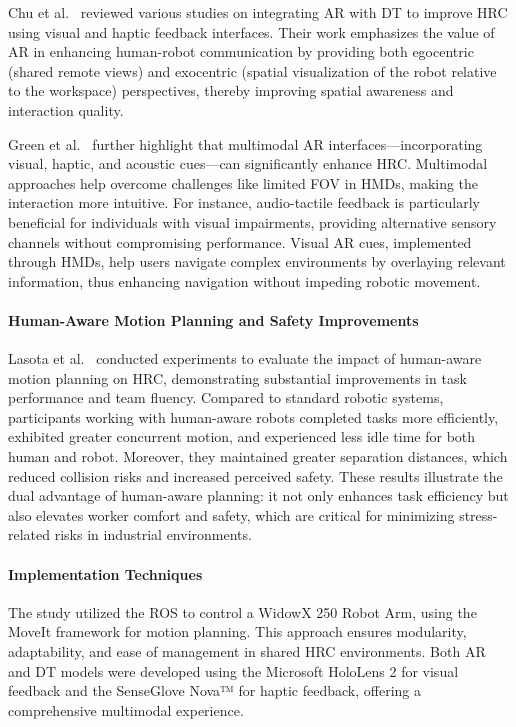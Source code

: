Chu et al.~\cite{CHU2023313} reviewed various studies on integrating \ac{AR} with \ac{DT} to improve \ac{HRC} using visual and haptic feedback interfaces. Their work emphasizes the value of \ac{AR} in enhancing human-robot communication by providing both egocentric (shared remote views) and exocentric (spatial visualization of the robot relative to the workspace) perspectives, thereby improving spatial awareness and interaction quality. 

Green et al.~\cite{doi:10.5772/5664} further highlight that multimodal \ac{AR} interfaces—incorporating visual, haptic, and acoustic cues—can significantly enhance \ac{HRC}. Multimodal approaches help overcome challenges like limited \ac{FOV} in \ac{HMDs}, making the interaction more intuitive. For instance, audio-tactile feedback is particularly beneficial for individuals with visual impairments, providing alternative sensory channels without compromising performance. Visual \ac{AR} cues, implemented through \ac{HMDs}, help users navigate complex environments by overlaying relevant information, thus enhancing navigation without impeding robotic movement.

\paragraph{Human-Aware Motion Planning and Safety Improvements}

Lasota et al.~\cite{doi:10.1177/0018720814565188} conducted experiments to evaluate the impact of human-aware motion planning on \ac{HRC}, demonstrating substantial improvements in task performance and team fluency. Compared to standard robotic systems, participants working with human-aware robots completed tasks more efficiently, exhibited greater concurrent motion, and experienced less idle time for both human and robot. Moreover, they maintained greater separation distances, which reduced collision risks and increased perceived safety. These results illustrate the dual advantage of human-aware planning: it not only enhances task efficiency but also elevates worker comfort and safety, which are critical for minimizing stress-related risks in industrial environments.

\paragraph{Implementation Techniques}

The study utilized the \ac{ROS} to control a WidowX 250 Robot Arm, using the MoveIt framework for motion planning. This approach ensures modularity, adaptability, and ease of management in shared \ac{HRC} environments. Both \ac{AR} and \ac{DT} models were developed using the Microsoft HoloLens 2 for visual feedback and the SenseGlove Nova™ for haptic feedback, offering a comprehensive multimodal experience.

